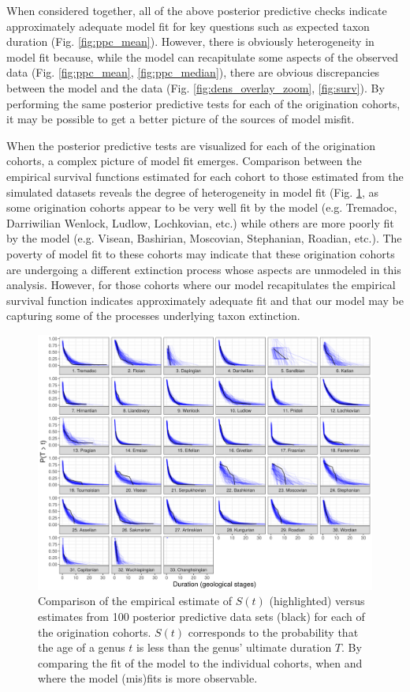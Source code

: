\documentclass[11pt]{article}
\begin{document}
When considered together, all of the above posterior predictive checks indicate approximately adequate model fit for key questions such as expected taxon duration (Fig. \ref{fig:ppc_mean}). However, there is obviously heterogeneity in model fit because, while the model can recapitulate some aspects of the observed data (Fig. \ref{fig:ppc_mean}, \ref{fig:ppc_median}), there are obvious discrepancies between the model and the data (Fig. \ref{fig:dens_overlay_zoom}, \ref{fig:surv}). By performing the same posterior predictive tests for each of the origination cohorts, it may be possible to get a better picture of the sources of model misfit.

When the posterior predictive tests are visualized for each of the origination cohorts, a complex picture of model fit emerges. Comparison between the empirical survival functions estimated for each cohort to those estimated from the simulated datasets reveals the degree of heterogeneity in model fit (Fig. \ref{fig:surv_group}, as some origination cohorts appear to be very well fit by the model (e.g. Tremadoc, Darriwilian Wenlock, Ludlow, Lochkovian, etc.) while others are more poorly fit by the model (e.g. Visean, Bashirian, Moscovian, Stephanian, Roadian, etc.). The poverty of model fit to these cohorts may indicate that these origination cohorts are undergoing a different extinction process whose aspects are unmodeled in this analysis. However, for those cohorts where our model recapitulates the empirical survival function indicates approximately adequate fit and that our model may be capturing some of the processes underlying taxon extinction.

\begin{figure}[ht]
  \centering
  \includegraphics[height = 0.5\textheight,width=\textwidth,keepaspectratio=true]{figure/ppc_surv_coh}
  \caption{Comparison of the empirical estimate of \(S(t)\) (highlighted) versus estimates from 100 posterior predictive data sets (black) for each of the origination cohorts. \(S(t)\) corresponds to the probability that the age of a genus \(t\) is less than the genus' ultimate duration \(T\). By comparing the fit of the model to the individual cohorts, when and where the model (mis)fits is more observable. }
  \label{fig:surv_group}
\end{figure}
\end{document}
